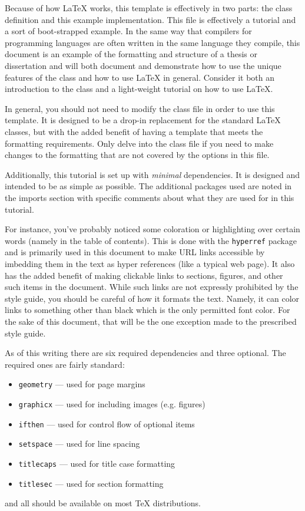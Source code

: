 \documentclass{thesis-dissertation}
\begin{document}
Because of how \LaTeX{} works, this template is effectively in two parts: the class definition and this example implementation. This file is effectively a tutorial and a sort of boot-strapped example. In the same way that compilers for programming languages are often written in the same language they compile, this document is an example of the formatting and structure of a thesis or dissertation and will both document and demonstrate how to use the unique features of the class and how to use \LaTeX{} in general. Consider it both an introduction to the class and a light-weight tutorial on how to use \LaTeX{}.

In general, you should not need to modify the class file in order to use this template. It is designed to be a drop-in replacement for the standard \LaTeX{} classes, but with the added benefit of having a template that meets the formatting requirements. Only delve into the class file if you need to make changes to the formatting that are not covered by the options in this file.

Additionally, this tutorial is set up with \textit{minimal} dependencies. It is designed and intended to be as simple as possible. The additional packages used are noted in the imports section with specific comments about what they are used for in this tutorial. 

For instance, you've probably noticed some coloration or highlighting over certain words (namely in the table of contents). This is done with the \texttt{hyperref} package and is primarily used in this document to make URL links accessible by imbedding them in the text as hyper references (like a typical web page). It also has the added benefit of making clickable links to sections, figures, and other such items in the document. While such links are not expressly prohibited by the style guide, you should be careful of how it formats the text. Namely, it can color links to something other than black which is the only permitted font color. For the sake of this document, that will be the one exception made to the prescribed style guide.

As of this writing there are six required dependencies and three optional. The required ones are fairly standard: \begin{itemize}
  \singlespacing{}
  \item \verb|geometry| --- used for page margins
  \item \verb|graphicx| --- used for including images (e.g. figures)
  \item \verb|ifthen| --- used for control flow of optional items
  \item \verb|setspace| --- used for line spacing
  \item \verb|titlecaps| --- used for title case formatting
  \item \verb|titlesec| --- used for section formatting
\end{itemize} and all should be available on most \TeX{} distributions. 
\end{document}
